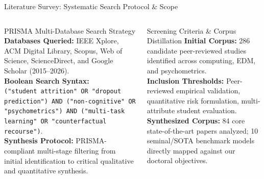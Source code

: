 \documentclass{beamer}
\begin{document}
\begin{frame}[t]{Literature Survey: Systematic Search Protocol \& Scope}
  \begin{columns}[T]
    \begin{block}{\scriptsize PRISMA Multi-Database Search Strategy}
      \fontsize{5.2pt}{6.6pt}\selectfont
      \textbf{Databases Queried:} IEEE Xplore, ACM Digital Library, Scopus, Web of Science, ScienceDirect, and Google Scholar (2015--2026).\\[3pt]
      \textbf{Boolean Search Syntax:}\\
      \texttt{("student attrition" OR "dropout prediction") AND ("non-cognitive" OR "psychometrics") AND ("multi-task learning" OR "counterfactual recourse")}.\\[3pt]
      \textbf{Synthesis Protocol:} PRISMA-compliant multi-stage filtering from initial identification to critical qualitative and quantitative synthesis.
    \end{block}
    \vspace{3pt}
    \begin{block}{\scriptsize Screening Criteria \& Corpus Distillation}
      \fontsize{5.2pt}{6.6pt}\selectfont
      \textbf{Initial Corpus:} 286 candidate peer-reviewed studies identified across computing, EDM, and psychometrics.\\[2pt]
      \textbf{Inclusion Thresholds:} Peer-reviewed empirical validation, quantitative risk formulation, multi-attribute student evaluation.\\[2pt]
      \textbf{Synthesized Corpus:} 84 core state-of-the-art papers analyzed; 10 seminal/SOTA benchmark models directly mapped against our doctoral objectives.
    \end{block}


\end{columns}
\end{frame}
\end{document}
